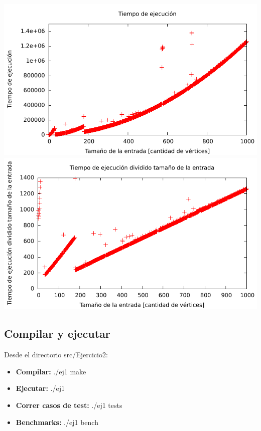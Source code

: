 \includegraphics[width=\textwidth]{ej2/cuadratico.pdf}
\includegraphics[width=\textwidth]{ej2/lineal.pdf}

\subsection{Compilar y ejecutar}
Desde el directorio src/Ejercicio2:
\begin{itemize}
   \item {\bf Compilar:} ./ej1 make
   \item {\bf Ejecutar:} ./ej1
   \item {\bf Correr casos de test:} ./ej1 tests
   \item {\bf Benchmarks:} ./ej1 bench
\end{itemize}

